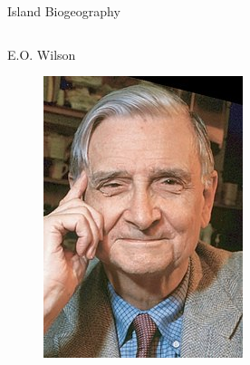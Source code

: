 \documentclass{beamer}
\begin{document}
\begin{frame}{Island Biogeography}
\begin{columns}
		\begin{block}{E.O. Wilson}
			\begin{figure}[ht]
				\centering
				\includegraphics[scale=0.46]{fig/APIS/Wilson.jpg}
				\label{E.O. Wilson}
			\end{figure}
		\end{block}
	
	\end{columns}

\end{frame}
\end{document}

